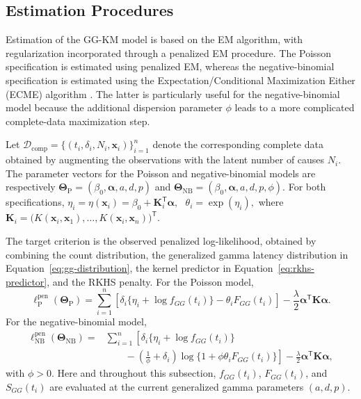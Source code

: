 \subsection{Estimation Procedures}\label{sec:penalized-estimation}

Estimation of the GG-KM model is based on the EM algorithm, with
regularization incorporated through a penalized EM procedure. The
Poisson specification is estimated using penalized EM, whereas the
negative-binomial specification is estimated using the
Expectation/Conditional Maximization Either (ECME) algorithm
\cite{mclachlan2008algorithm}. The latter is particularly useful for
the negative-binomial model because the additional dispersion parameter
$\phi$ leads to a more complicated complete-data maximization step.

Let
$
    \mathcal D_{\mathrm{comp}}
    =
    \{(t_i,\delta_i,N_i,\bm{x}_i)\}_{i=1}^{n}
$
denote the corresponding complete data obtained by augmenting the
observations with the latent number of causes $N_i$. The parameter
vectors for the Poisson and negative-binomial models are respectively
$
    \bm\Theta_{\mathrm P}
    =
    (\beta_0,\bm{\alpha},a,d,p)
$
and
$
    \bm\Theta_{\mathrm{NB}}
    =
    (\beta_0,\bm{\alpha},a,d,p,\phi).
$
For both specifications,
$
    \eta_i=
    \eta(\bm{x}_i)
    =
    \beta_0+\bm K_i^{\mathsf T}\bm{\alpha},
    \text{ }
    \theta_i=\exp(\eta_i),
$
where
$
    \bm K_i
    =
    \bigl(
        K(\bm{x}_i,\bm{x}_1),
        \ldots,
        K(\bm{x}_i,\bm{x}_n)
    \bigr)^{\mathsf T}.
$

The target criterion is the observed penalized log-likelihood, obtained
by combining the count distribution, the generalized gamma latency
distribution in Equation~\eqref{eq:gg-distribution}, the kernel
predictor in Equation~\eqref{eq:rkhs-predictor}, and the RKHS penalty.
For the Poisson model,
\begin{equation}
    \ell^{\mathrm{pen}}_{\mathrm P}
    (\bm\Theta_{\mathrm P})
    =
    \sum_{i=1}^{n}
    \left[
        \delta_i
        \{\eta_i+\log f_{GG}(t_i)\}
        -
        \theta_iF_{GG}(t_i)
    \right]
    -
    \frac{\lambda}{2}
    \bm{\alpha}^{\mathsf T}
    \bm K
    \bm{\alpha}.
    \label{eq:poisson-observed-likelihood}
\end{equation}
For the negative-binomial model,
\begin{equation}
    \begin{aligned}
        \ell^{\mathrm{pen}}_{\mathrm{NB}}
        (\bm\Theta_{\mathrm{NB}})
        ={}&
        \sum_{i=1}^{n}
        \left[
            \delta_i
            \{\eta_i+\log f_{GG}(t_i)\}
        \right.\\
        &\left.
            \qquad-
            \left(
                \frac{1}{\phi}+\delta_i
            \right)
            \log
            \{1+\phi\theta_iF_{GG}(t_i)\}
        \right]
        -
        \frac{\lambda}{2}
        \bm{\alpha}^{\mathsf T}
        \bm K
        \bm{\alpha},
    \end{aligned}
    \label{eq:nb-observed-likelihood}
\end{equation}
with $\phi>0$. Here and throughout this subsection,
$f_{GG}(t_i)$, $F_{GG}(t_i)$, and $S_{GG}(t_i)$ are evaluated at the
current generalized gamma parameters $(a,d,p)$.

